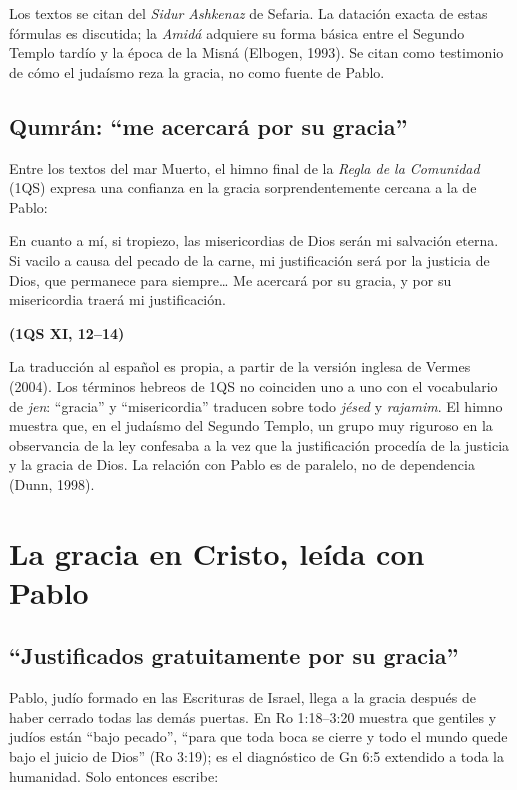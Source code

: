 \documentclass[11pt,letterpaper]{article}
\newcommand{\fuente}[1]{\par\hfill{\upshape\bfseries\small\textcolor{azul}{#1}}}
\begin{document}
\begin{nota}[Precisión]
Los textos se citan del \emph{Sidur Ashkenaz} de Sefaria. La datación exacta de estas fórmulas es discutida; la \emph{Amidá} adquiere su forma básica entre el Segundo Templo tardío y la época de la Misná (Elbogen, 1993). Se citan como testimonio de cómo el judaísmo reza la gracia, no como fuente de Pablo.
\end{nota}

\subsection{Qumrán: ``me acercará por su gracia''}
Entre los textos del mar Muerto, el himno final de la \emph{Regla de la Comunidad} (1QS) expresa una confianza en la gracia sorprendentemente cercana a la de Pablo:

\begin{cita}En cuanto a mí, si tropiezo, las misericordias de Dios serán mi salvación eterna. Si vacilo a causa del pecado de la carne, mi justificación será por la justicia de Dios, que permanece para siempre\ldots{} Me acercará por su gracia, y por su misericordia traerá mi justificación.\fuente{(1QS XI, 12--14)}\end{cita}

\begin{nota}[Precisión]
La traducción al español es propia, a partir de la versión inglesa de Vermes (2004). Los términos hebreos de 1QS no coinciden uno a uno con el vocabulario de \emph{jen}: ``gracia'' y ``misericordia'' traducen sobre todo \emph{jésed} y \emph{rajamim}. El himno muestra que, en el judaísmo del Segundo Templo, un grupo muy riguroso en la observancia de la ley confesaba a la vez que la justificación procedía de la justicia y la gracia de Dios. La relación con Pablo es de paralelo, no de dependencia (Dunn, 1998).
\end{nota}

\section{La gracia en Cristo, leída con Pablo}

\subsection{``Justificados gratuitamente por su gracia''}
Pablo, judío formado en las Escrituras de Israel, llega a la gracia después de haber cerrado todas las demás puertas. En Ro 1:18--3:20 muestra que gentiles y judíos están ``bajo pecado'', ``para que toda boca se cierre y todo el mundo quede bajo el juicio de Dios'' (Ro 3:19); es el diagnóstico de Gn 6:5 extendido a toda la humanidad. Solo entonces escribe:
\end{document}
